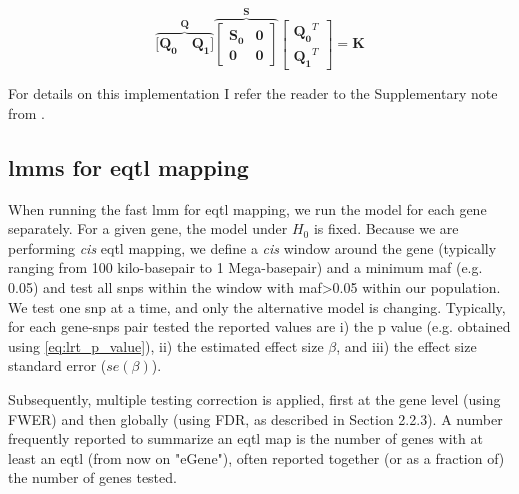 \begin{equation}\label{eq:economic_eigen_decomposition}
    \overbrace{[\mathbf{Q_0} \quad \mathbf{Q_1]}}^{\mathbf{Q}}
            \overbrace{\left[\begin{array}{cc}
                \mathbf{S_0} & \mathbf{0}\\
                        \mathbf{0} & \mathbf{0}
            \end{array}\right]}^{\mathbf{S}}
        \left[\begin{array}{c}
            \mathbf{Q_0}^T \\
            \mathbf{Q_1}^T
        \end{array}\right] = \mathbf{K}
\end{equation}

For details on this implementation I refer the reader to the Supplementary note from \cite{lippert2011fast}.

\subsection{\gls{lmm}s for \gls{eqtl} mapping}

When running the fast \gls{lmm} for e\gls{qtl} mapping, we run the model for each gene separately.
For a given gene, the model under $H_0$ is fixed.
Because we are performing \textit{cis} \gls{eqtl} mapping, we define a \textit{cis} window around the gene (typically ranging from 100 kilo-basepair to 1 Mega-basepair) and a minimum \gls{maf} (e.g. 0.05) and test all \gls{snp}s within the window with \gls{maf}>0.05 within our population.  
We test one \gls{snp} at a time, and only the alternative model is changing.
Typically, for each gene-\gls{snp}s pair tested the reported values are i) the p value (e.g. obtained using \eqref{eq:lrt_p_value}), ii) the estimated effect size $\beta$, and iii) the effect size standard error ($se(\beta)$).


Subsequently, multiple testing correction is applied, first at the gene level (using FWER) and then globally (using FDR, as described in Section 2.2.3).
A number frequently reported to summarize an e\gls{qtl} map is the number of genes with at least an e\gls{qtl} (from now on "eGene"), often reported together (or as a fraction of) the number of genes tested.


